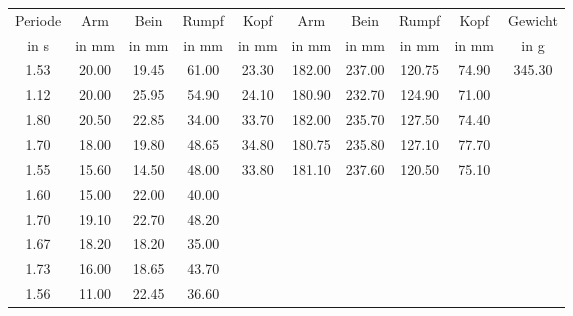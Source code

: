 \begin{center}
\begin{tabular}{ c || c | c | c | c || c | c | c | c || c }
\hline
	Periode & Arm & Bein & Rumpf & Kopf & Arm & Bein & Rumpf & Kopf & Gewicht \\
	in s & in mm & in mm & in mm & in mm & in mm &  in mm & in mm & in mm & in g \\

\hline
	1.53 & 20.00 & 19.45 & 61.00 & 23.30 & 182.00 & 237.00 & 120.75 & 74.90 & 345.30 \\
	1.12 & 20.00 & 25.95 & 54.90 & 24.10 & 180.90 & 232.70 & 124.90 & 71.00 \\
	1.80 & 20.50 & 22.85 & 34.00 & 33.70 & 182.00 & 235.70 & 127.50 & 74.40 & \\
	1.70 & 18.00 & 19.80 & 48.65 & 34.80 & 180.75 & 235.80 & 127.10 & 77.70 & \\
	1.55 & 15.60 & 14.50 & 48.00 & 33.80 & 181.10 & 237.60 & 120.50 & 75.10 & \\
	1.60 & 15.00 & 22.00 & 40.00 & & & & & & \\
	1.70 & 19.10 & 22.70 & 48.20 & & & & & & \\
	1.67 & 18.20 & 18.20 & 35.00 & & & & & & \\
	1.73 & 16.00 & 18.65 & 43.70 & & & & & & \\
	1.56 & 11.00 & 22.45 & 36.60 & & & & & & \\
\end{tabular}
\end{center}
